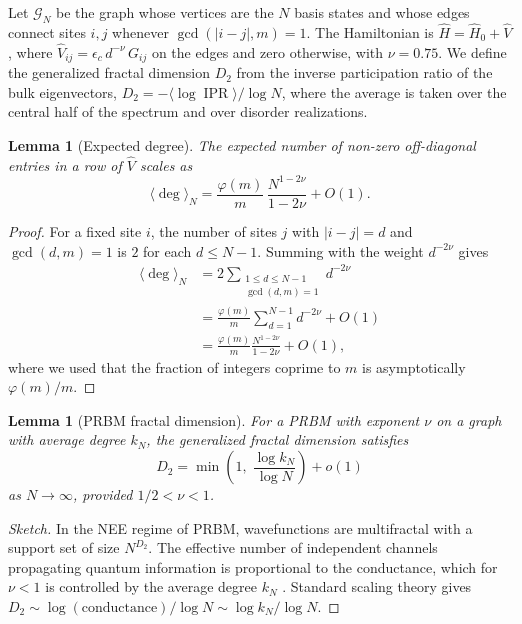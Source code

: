 \documentclass[11pt,a4paper]{article}
\newtheorem{lemma}[theorem]{Lemma}
\DeclareMathOperator{\IPR}{IPR}
\begin{document}
Let $\mathcal{G}_N$ be the graph whose vertices are the $N$ basis states and whose edges connect sites $i,j$ whenever $\gcd(|i-j|,m)=1$. The Hamiltonian is $\hat H = \hat H_0 + \hat V$, where $\hat V_{ij} = \epsilon_c \, d^{-\nu} \, G_{ij}$ on the edges and zero otherwise, with $\nu=0.75$. We define the generalized fractal dimension $D_2$ from the inverse participation ratio of the bulk eigenvectors, $D_2 = -\langle\log \IPR\rangle / \log N$, where the average is taken over the central half of the spectrum and over disorder realizations.

\begin{lemma}[Expected degree]\label{lem:degree}
The expected number of non-zero off-diagonal entries in a row of $\hat V$ scales as
\begin{equation}
\langle \deg \rangle_N = \frac{\varphi(m)}{m} \, \frac{N^{1-2\nu}}{1-2\nu} + O(1).
\end{equation}
\end{lemma}
\begin{proof}
For a fixed site $i$, the number of sites $j$ with $|i-j|=d$ and $\gcd(d,m)=1$ is $2$ for each $d\le N-1$. Summing with the weight $d^{-2\nu}$ gives
\begin{align*}
\langle \deg \rangle_N &= 2\sum_{\substack{1\le d\le N-1 \\ \gcd(d,m)=1}} d^{-2\nu} \\
&= \frac{\varphi(m)}{m} \sum_{d=1}^{N-1} d^{-2\nu} + O(1) \\
&= \frac{\varphi(m)}{m} \frac{N^{1-2\nu}}{1-2\nu} + O(1),
\end{align*}
where we used that the fraction of integers coprime to $m$ is asymptotically $\varphi(m)/m$.
\end{proof}

\begin{lemma}[PRBM fractal dimension]\label{lem:prbm}
For a PRBM with exponent $\nu$ on a graph with average degree $k_N$, the generalized fractal dimension satisfies
\begin{equation}
D_2 = \min\!\left(1,\; \frac{\log k_N}{\log N}\right) + o(1)
\end{equation}
as $N\to\infty$, provided $1/2<\nu<1$.
\end{lemma}
\begin{proof}[Sketch]
In the NEE regime of PRBM, wavefunctions are multifractal with a support set of size $N^{D_2}$. The effective number of independent channels propagating quantum information is proportional to the conductance, which for $\nu<1$ is controlled by the average degree $k_N$ \cite{Mirlin1996}. Standard scaling theory gives $D_2 \sim \log(\text{conductance})/\log N \sim \log k_N / \log N$.
\end{proof}
\end{document}
